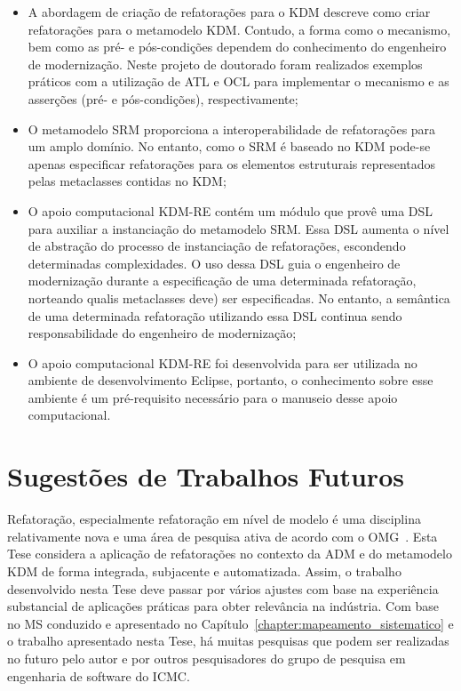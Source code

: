 \begin{itemize}

\item A abordagem de criação de refatorações para o KDM descreve como criar refatorações para o metamodelo KDM. Contudo, a forma como o mecanismo, bem como as pré- e pós-condições dependem do conhecimento do engenheiro de modernização. Neste projeto de doutorado foram realizados exemplos práticos com a utilização de ATL e OCL para implementar o mecanismo e as asserções (pré- e pós-condições), respectivamente;

\item O metamodelo SRM proporciona a interoperabilidade de refatorações para um amplo domínio. No entanto, como o SRM é baseado no KDM pode-se apenas especificar refatorações para os elementos estruturais representados pelas metaclasses contidas no KDM;  


\item O apoio computacional KDM-RE contém um módulo que provê uma DSL para auxiliar a instanciação do metamodelo SRM. Essa DSL aumenta o nível de abstração do processo de instanciação de refatorações, escondendo determinadas complexidades. O uso dessa DSL guia o engenheiro de modernização durante a especificação de uma determinada refatoração, norteando qualis metaclasses deve) ser especificadas. No entanto, a semântica de uma determinada refatoração utilizando essa DSL continua sendo responsabilidade do engenheiro de modernização;


\item O apoio computacional KDM-RE foi desenvolvida para ser utilizada no ambiente de desenvolvimento Eclipse, portanto, o conhecimento sobre esse ambiente é um pré-requisito necessário para o manuseio desse apoio computacional.
\end{itemize}

\section{Sugestões de Trabalhos Futuros}\label{sec:trabalhos_futuros_tese}

Refatoração, especialmente refatoração em nível de modelo é uma disciplina relativamente nova e uma área de pesquisa ativa de acordo com o OMG~\cite{OMG_OMG, ADM:OMG}. Esta Tese considera a aplicação de refatorações no contexto da ADM e do metamodelo KDM de forma integrada, subjacente e automatizada. Assim, o trabalho desenvolvido nesta Tese deve passar por vários ajustes com base na experiência substancial de aplicações práticas para obter relevância na indústria. Com base no MS conduzido e apresentado no Capítulo~\ref{chapter:mapeamento_sistematico} e o trabalho apresentado nesta Tese, há muitas pesquisas que podem ser realizadas no futuro pelo autor e por outros pesquisadores do grupo de pesquisa em engenharia de software do ICMC.

